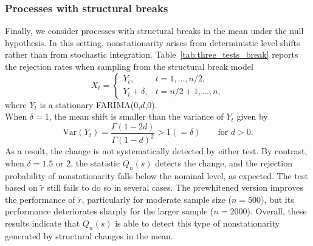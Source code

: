 \documentclass[10pt,a4paper]{amsart}
\numberwithin{equation}{section}
\begin{document}
\subsubsection{Processes with structural breaks}
Finally, we consider processes with structural breaks in the mean under the null hypothesis. In this setting, nonstationarity arises from deterministic level shifts rather than from stochastic integration. Table~\ref{tab:three_tests_break} reports the rejection rates when sampling from the structural break model
\[
X_t=
\begin{cases}
Y_t, & t=1,\ldots,n/2,\\[6pt]
Y_t+\delta, & t=n/2+1,\ldots,n,
\end{cases}
\]
where $Y_t$ is a stationary FARIMA(0,$d$,0).\\
When $\delta=1$, the mean shift is smaller than the variance of $Y_t$ given by
\[
\textrm{Var}(Y_t)=\frac{\Gamma(1-2d)}{\Gamma(1-d)^2} > 1(=\delta) \qquad \text{for } d>0.
\]
As a result, the change is not systematically detected by either test. By contrast, when $\delta=1.5$ or $2$, the statistic $Q_n(s)$ detects the change, and the rejection probability of nonstationarity falls below the nominal level, as expected. The test based on $\tilde r$ still fails to do so in several cases. The prewhitened version improves the performance of $\tilde r$, particularly for moderate sample size ($n=500$), but its performance deteriorates sharply for the larger sample ($n=2000$). Overall, these results indicate that $Q_n(s)$ is able to detect this type of nonstationarity generated by structural changes in the mean.
%
\end{document}
